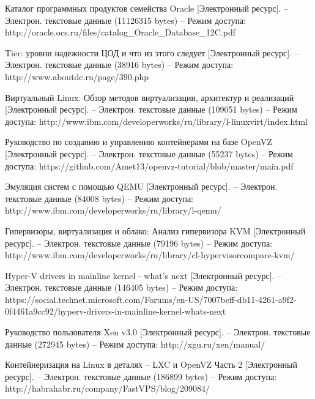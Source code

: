 \begingroup 
\renewcommand{\section}[2]{\anonsection{Библиографический список}}
\begin{thebibliography}{00}

    Каталог программных продуктов семейства Oracle
    [Электронный ресурс]. --
    Электрон. текстовые данные (11126315 bytes) --
    Режим доступа: http://oracle.ocs.ru/files/catalog\_Oracle\_Database\_12C.pdf

    Tier: уровни надежности ЦОД и что из этого следует
    [Электронный ресурс]. --
    Электрон. текстовые данные (38916 bytes) --
    Режим доступа: http://www.aboutdc.ru/page/390.php

    Виртуальный Linux. Обзор методов виртуализации, архитектур и реализаций
    [Электронный ресурс]. --
    Электрон. текстовые данные (109051 bytes) -- 
    Режим доступа: http://www.ibm.com/developerworks/ru/library/l-linuxvirt/index.html

    Руководство по созданию и управлению контейнерами на базе OpenVZ 
    [Электронный ресурс]. --
    Электрон. текстовые данные (55237 bytes) -- 
    Режим доступа: https://github.com/Amet13/openvz-tutorial/blob/master/main.pdf

    Эмуляция систем с помощью QEMU
    [Электронный ресурс]. --
    Электрон. текстовые данные (84008 bytes) --
    Режим доступа: http://www.ibm.com/developerworks/ru/library/l-qemu/

    Гипервизоры, виртуализация и облако: Анализ гипервизора KVM
    [Электронный ресурс]. --
    Электрон. текстовые данные (79196 bytes) --
    Режим доступа: http://www.ibm.com/developerworks/ru/library/cl-hypervisorcompare-kvm/

    Hyper-V drivers in mainline kernel - what's next
    [Электронный ресурс]. --
    Электрон. текстовые данные (146405 bytes) --
    Режим доступа: https://social.technet.microsoft.com/Forums/en-US/7007beff-db11-4261-a9f2-0f4461a9cc92/hyperv-drivers-in-mainline-kernel-whats-next

    Руководство пользователя Xen v3.0
    [Электронный ресурс]. --
    Электрон. текстовые данные (272945 bytes) --
    Режим доступа: http://xgu.ru/xen/manual/

    Контейнеризация на Linux в деталях -- LXC и OpenVZ Часть 2
    [Электронный ресурс]. --
    Электрон. текстовые данные (186899 bytes) -- 
    Режим доступа: http://habrahabr.ru/company/FastVPS/blog/209084/


\end{thebibliography}
